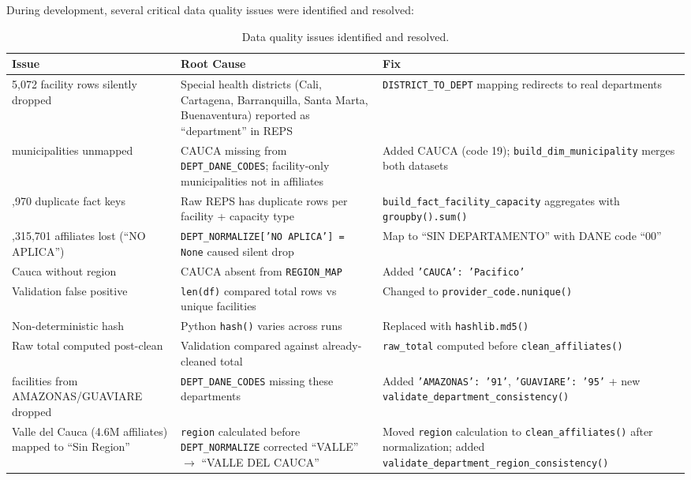 \documentclass[12pt,a4paper]{article}
\begin{document}
During development, several critical data quality issues were identified and resolved:

\begin{table}[H]
\centering
\small
\begin{tabularx}{\textwidth}{p{4.5cm} X X}
\toprule
\textbf{Issue} & \textbf{Root Cause} & \textbf{Fix}\\
\midrule
5,072 facility rows silently dropped & Special health districts (Cali, Cartagena, Barranquilla, Santa Marta, Buenaventura) reported as ``department'' in REPS & \texttt{DISTRICT\_TO\_DEPT} mapping redirects to real departments\\
\addlinespace
80 municipalities unmapped & CAUCA missing from \texttt{DEPT\_DANE\_CODES}; facility-only municipalities not in affiliates & Added CAUCA (code 19); \texttt{build\_dim\_municipality} merges both datasets\\
\addlinespace
13,970 duplicate fact keys & Raw REPS has duplicate rows per facility + capacity type & \texttt{build\_fact\_facility\_capacity} aggregates with \texttt{groupby().sum()}\\
\addlinespace
1,315,701 affiliates lost (``NO APLICA'') & \texttt{DEPT\_NORMALIZE['NO APLICA'] = None} caused silent drop & Map to ``SIN DEPARTAMENTO'' with DANE code ``00''\\
\addlinespace
Cauca without region & CAUCA absent from \texttt{REGION\_MAP} & Added \texttt{'CAUCA': 'Pacifico'}\\
\addlinespace
Validation false positive & \texttt{len(df)} compared total rows vs unique facilities & Changed to \texttt{provider\_code.nunique()}\\
\addlinespace
Non-deterministic hash & Python \texttt{hash()} varies across runs & Replaced with \texttt{hashlib.md5()}\\
\addlinespace
Raw total computed post-clean & Validation compared against already-cleaned total & \texttt{raw\_total} computed before \texttt{clean\_affiliates()}\\
\addlinespace
29 facilities from AMAZONAS/GUAVIARE dropped & \texttt{DEPT\_DANE\_CODES} missing these departments & Added \texttt{'AMAZONAS': '91'}, \texttt{'GUAVIARE': '95'} + new \texttt{validate\_department\_consistency()}\\
\addlinespace
Valle del Cauca (4.6M affiliates) mapped to ``Sin Region'' & \texttt{region} calculated before \texttt{DEPT\_NORMALIZE} corrected ``VALLE'' $\to$ ``VALLE DEL CAUCA'' & Moved \texttt{region} calculation to \texttt{clean\_affiliates()} after normalization; added \texttt{validate\_department\_region\_consistency()}\\
\bottomrule
\end{tabularx}
\caption{Data quality issues identified and resolved.}
\end{table}
\end{document}
